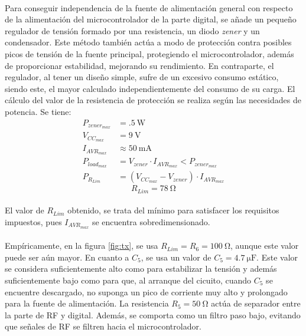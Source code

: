 \paragraph{}
Para conseguir independencia de la fuente de alimentaci\'on general con respecto de la alimentaci\'on del microcontrolador de la parte digital, se añade un pequeño regulador de tensión formado por una resistencia, un diodo \textit{zener} y un condensador. 
Este método también actúa a modo de protección contra posibles picos de tensión de la fuente principal, protegiendo el microcontrolador, además de proporcionar estabilidad, mejorando su rendimiento.
En contraparte, el regulador, al tener un diseño simple, sufre de un excesivo consumo estático, siendo este, el mayor calculado independientemente del consumo de su carga.
El cálculo del valor de la resistencia de protección se realiza según las necesidades de potencia. Se tiene:
\begin{align*}
   P_{zener_{max}} &= \SI{.5}{\watt} \\
   V_{CC_{max}} &= \SI{9}{\volt} \\
   I_{AVR_{max}} &\approx \SI{50}{\milli\ampere} \\
   P_{load_{max}} &= V_{zener} \cdot I_{AVR_{max}} < P_{zener_{max}}\\
   P_{R_{Lim}} &= (V_{CC_{max}} - V_{zener}) \cdot I_{AVR_{max}}
\end{align*}
\begin{equation}
   R_{Lim} = \SI{78}{\ohm}
\end{equation}
\paragraph{}
El valor de $R_{Lim}$ obtenido, se trata del m\'inimo para satisfacer los requisitos impuestos, pues $I_{AVR_{max}}$ se encuentra sobredimensionado. 
\paragraph{}
Empíricamente, en la figura \ref{fig:tx}, se usa $R_{Lim} = R_6 = \SI{100}{\ohm}$, aunque este valor puede ser aún mayor.
En cuanto a $C_5$, se usa un valor de $C_5 = \SI{4.7}{\micro\farad}$. Este valor se considera suficientemente alto como para estabilizar la tensi\'on y adem\'as suficientemente bajo como para que, al arranque del cicuito, cuando $C_5$ se encuentre descargado, no suponga un pico de corriente muy alto y prolongado para la fuente de alimentaci\'on.
La resistencia $R_5 = \SI{50}{\ohm}$ act\'ua de separador entre la parte de RF y digital. Además, se comporta como un filtro paso bajo, evitando que señales de RF se filtren hacia el microcontrolador.
